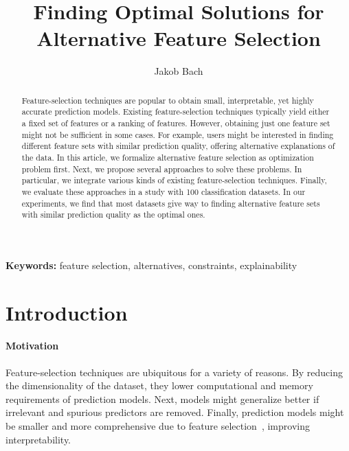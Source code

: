 \documentclass{article}
\title{Finding Optimal Solutions for Alternative Feature Selection}
\author{Jakob Bach}
\theoremstyle{definition}
\begin{document}
\maketitle

\begin{abstract}
Feature-selection techniques are popular to obtain small, interpretable, yet highly accurate prediction models.
Existing feature-selection techniques typically yield either a fixed set of features or a ranking of features.
However, obtaining just one feature set might not be sufficient in some cases.
For example, users might be interested in finding different feature sets with similar prediction quality, offering alternative explanations of the data.
In this article, we formalize alternative feature selection as optimization problem first.
Next, we propose several approaches to solve these problems.
In particular, we integrate various kinds of existing feature-selection techniques.
Finally, we evaluate these approaches in a study with 100 classification datasets.
In our experiments, we find that most datasets give way to finding alternative feature sets with similar prediction quality as the optimal ones.
\end{abstract}

\textbf{Keywords:} feature selection, alternatives, constraints, explainability

\section{Introduction}
\label{sec:introduction}

\paragraph{Motivation}

Feature-selection techniques are ubiquitous for a variety of reasons.
By reducing the dimensionality of the dataset, they lower computational and memory requirements of prediction models.
Next, models might generalize better if irrelevant and spurious predictors are removed.
Finally, prediction models might be smaller and more comprehensive due to feature selection~\cite{li2017feature}, improving interpretability.
\end{document}
